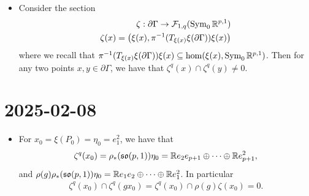 \documentclass{report}
\begin{document}
\begin{itemize}
\begin{proof}
        Let now $P = \Stab_{\SO(p,1)} x$ and $P' = \Stab_{\SO(p,1)} x'$ be two distinct maximal parabolic subgroups.
        Then $\langle x, x' \rangle \neq 0$, since otherwise, $\mathbb R x \oplus \mathbb R x'$ would be a two-dimensional totally isotropic subspace, which is not possible for a form of signature $(p,1)$.
        Thus we may assume that $\langle x, x' \rangle = 1$, i.e.\ the restriction of the form on $\mathbb R x \oplus \mathbb Rx'$ has the following matrix form:
        \[
        \begin{pmatrix}
            0 & 1 \\
            1 & 0
        \end{pmatrix}.
        \]
        In particular $\mathbb Rx \oplus \mathbb Rx'$ is non-degenerate, so there exists a transformation $g \in \SO(p,1)$ that sends $x$ to $e_{p+1}$ and $x'$ to $e_1$.
        For such a transformation, we have $g \cdot P = P_0$ and $g \cdot P' = P_0^t$.
    \end{proof}
    \item Consider the section
    \begin{align*}
        \zeta: \partial \Gamma \to \mathcal F_{1, q} (\operatorname{Sym}_0 \mathbb R^{p,1})\\
        \zeta(x) = \left(\xi(x), \pi^{-1}(T_{\xi(x)} \xi(\partial \Gamma))\xi(x)\right)
    \end{align*}
    where we recall that $\pi^{-1}(T_{\xi(x)} \xi(\partial \Gamma))\xi(x) \subseteq \hom(\xi(x), \operatorname{Sym}_0 \mathbb R^{p,1})$.
    Then for any two points $x, y \in \partial \Gamma$, we have that $\zeta^q(x) \cap \zeta^q(y) \neq 0$.
\end{itemize}
\section{2025-02-08}
\begin{itemize}
    \item For $x_0 = \xi(P_0) = \eta_0 = e_1^2$, we have that 
    \[
    \zeta^q(x_0) = \rho_*(\operatorname{{\mathfrak{so}}}(p,1)) \eta_0 = \mathbb R e_2 e_{p+1} \oplus \cdots \oplus \mathbb R e_{p+1}^2,
    \]
    and $\rho(g) \rho_*(\operatorname{{\mathfrak{so}}}(p,1)) \eta_0 = \mathbb R e_1 e_2 \oplus \cdots \oplus \mathbb R e_1^2$.
    In particular
    \begin{align*}
        \zeta^q(x_0) \cap \zeta^q(g x_0) = \zeta^q(x_0) \cap \rho(g) \zeta(x_0) = 0.
    \end{align*} 
\end{itemize}
\end{document}
